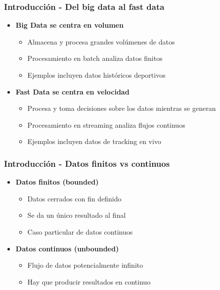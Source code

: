 \documentclass[aspectratio=169]{beamer}
\begin{document}
\begin{frame}
\frametitle{Introducción - Del big data al fast data}
	\begin{itemize}
		\item \textbf{Big Data se centra en volumen}
		\begin{itemize}
      \item Almacena y procesa grandes volúmenes de datos
      \item Procesamiento en batch analiza datos finitos
      \item Ejemplos incluyen datos históricos deportivos
		\end{itemize}

		\vspace{1em}

    \item \textbf{Fast Data se centra en velocidad}
		\begin{itemize}
      \item Procesa y toma decisiones sobre los datos mientras se generan
      \item Procesamiento en streaming analiza flujos continuos
      \item Ejemplos incluyen datos de tracking en vivo
		\end{itemize}
	\end{itemize}
\end{frame}

\begin{frame}
\frametitle{Introducción - Datos finitos vs continuos}
	\begin{itemize}
		\item \textbf{Datos finitos (bounded)}
		\begin{itemize}
			\item Datos cerrados con fin definido
			\item Se da un único resultado al final
			\item Caso particular de datos continuos
		\end{itemize}

		\vspace{1em}

    \item \textbf{Datos continuos (unbounded)}
		\begin{itemize}
			\item Flujo de datos potencialmente infinito
			\item Hay que producir resultados en continuo
		\end{itemize}
	\end{itemize}
\end{frame}
\end{document}

